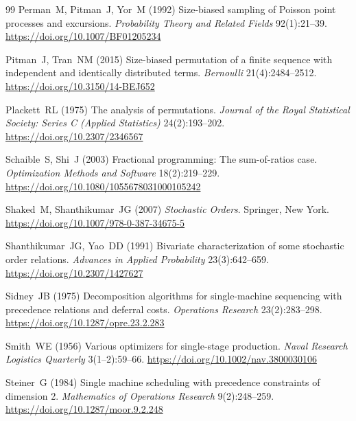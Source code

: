 \documentclass[pdflatex,iicol,sn-basic]{sn-jnl}
\theoremstyle{thmstyleone}
\theoremstyle{thmstyletwo}
\theoremstyle{thmstylethree}
\begin{document}
\begin{thebibliography}{99}
Perman~M, Pitman~J, Yor~M (1992) Size-biased sampling of Poisson point processes
and excursions.
\emph{Probability Theory and Related Fields} 92(1):21--39.
\url{https://doi.org/10.1007/BF01205234}

Pitman~J, Tran~NM (2015) Size-biased permutation of a finite sequence with
independent and identically distributed terms.
\emph{Bernoulli} 21(4):2484--2512.
\url{https://doi.org/10.3150/14-BEJ652}

Plackett~RL (1975) The analysis of permutations.
\emph{Journal of the Royal Statistical Society: Series C (Applied Statistics)}
24(2):193--202.
\url{https://doi.org/10.2307/2346567}

Schaible~S, Shi~J (2003) Fractional programming: The sum-of-ratios case.
\emph{Optimization Methods and Software} 18(2):219--229.
\url{https://doi.org/10.1080/1055678031000105242}

Shaked~M, Shanthikumar~JG (2007) \emph{Stochastic Orders}.
Springer, New York.
\url{https://doi.org/10.1007/978-0-387-34675-5}

Shanthikumar~JG, Yao~DD (1991) Bivariate characterization of some stochastic
order relations.
\emph{Advances in Applied Probability} 23(3):642--659.
\url{https://doi.org/10.2307/1427627}

Sidney~JB (1975) Decomposition algorithms for single-machine sequencing with
precedence relations and deferral costs.
\emph{Operations Research} 23(2):283--298.
\url{https://doi.org/10.1287/opre.23.2.283}

Smith~WE (1956) Various optimizers for single-stage production.
\emph{Naval Research Logistics Quarterly} 3(1--2):59--66.
\url{https://doi.org/10.1002/nav.3800030106}

Steiner~G (1984) Single machine scheduling with precedence constraints of
dimension 2.
\emph{Mathematics of Operations Research} 9(2):248--259.
\url{https://doi.org/10.1287/moor.9.2.248}

\end{thebibliography}
\endgroup
\end{document}
